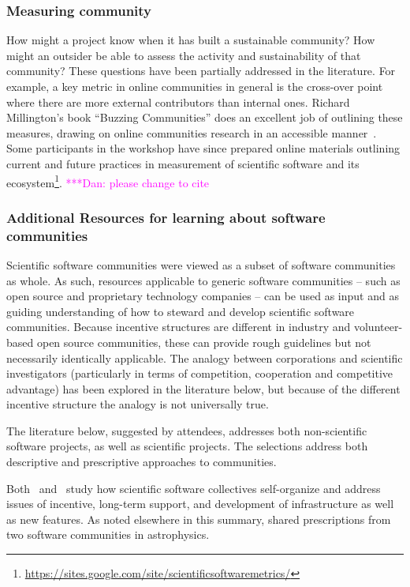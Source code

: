 \documentclass[11pt, oneside]{amsart}
\newcommand{\katznote}[1]{ {\textcolor{magenta}    { ***Dan:      #1 }}}
\begin{document}
\subsubsection{Measuring community}
How might a project know when it has built a sustainable community?  How might an outsider be able to assess the activity and sustainability of that community?  These questions have been partially addressed in the literature.  For example, a key metric in online communities in general is the cross-over point where there are more external contributors than internal ones. Richard Millington's book ``Buzzing Communities'' does an excellent job of outlining these measures, drawing on online communities research in an accessible manner~\cite{millington_buzzing_2012}. Some participants in the workshop have since prepared online materials outlining current and future practices in measurement of scientific software and its ecosystem\footnote{\url{https://sites.google.com/site/scientificsoftwaremetrics/}}. \katznote{please change to cite}

\subsubsection{Additional Resources for learning about software communities}

Scientific software communities were viewed as a subset of software communities
as whole.  As such, resources applicable to generic software communities --
such as open source and proprietary technology companies -- can be used as
input and as guiding understanding of how to steward and develop scientific
software communities.  Because incentive structures are different in industry
and volunteer-based open source communities, these can provide rough guidelines
but not necessarily identically applicable.  The analogy between corporations
and scientific investigators (particularly in terms of competition, cooperation
and competitive advantage) has been explored in the literature below, but
because of the different incentive structure the analogy is not universally
true.

The literature below, suggested by attendees, addresses both non-scientific
software projects, as well as scientific projects.  The selections address both
descriptive and prescriptive approaches to communities.

Both~\cite{howison_scientific_2011} and~\cite{howison_incentives_2013}
study how scientific software collectives self-organize and address issues of
incentive, long-term support, and development of infrastructure as well as new
features.  As noted elsewhere in this summary,
\cite{Turk:2013:SCH:2484762.2484782} shared prescriptions from two software
communities in astrophysics.
\end{document}
